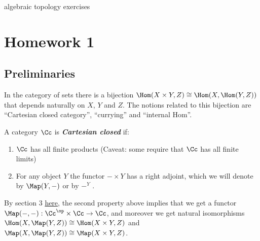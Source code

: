 % 
% 
% 





{\LARGE algebraic topology exercises}
\tableofcontents
\section{Homework 1}
\setcounter{subsection}{-1}
\subsection{Preliminaries}
	In the category of sets there is a bijection $\Hom(X\times Y, Z)\cong \Hom(X, \Hom(Y, Z))$ that depends naturally on $X$, $Y$ and $Z$. The notions related to this bijection are “Cartesian closed category”, “currying” and “internal Hom”.
\begin{defn}
	A category $\Cc$ is \textbf{\textit{Cartesian closed}} if:
	\begin{enumerate}
		\item $\Cc$ has all finite products (Caveat: some require that $\Cc$ has all finite limits)
		\item For any object $Y$ the functor $- \times Y$ has a right adjoint, which we will denote by $\Map(Y,-)$ or by $-^Y$ .
	\end{enumerate}
\end{defn}
\begin{remark}
	By section 3 \href{https://ncatlab.org/nlab/show/internal+hom }{here}, the second property above implies that we get a functor $\Map(-,-) : \Cc^{\op} \times \Cc \to \Cc$, and moreover we get natural isomorphisms $\Hom(X, \Map(Y, Z)) \cong \Hom(X \times Y, Z)$ and $\Map(X, \Map(Y, Z))\cong \Map(X \times Y, Z)$.
\end{remark}

